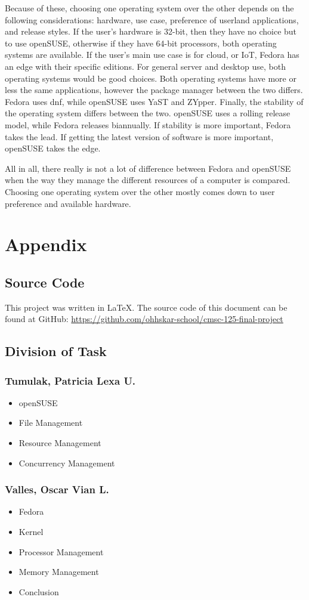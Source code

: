 \documentclass{article}
\begin{document}
Because of these, choosing one operating system over the other depends on the
following considerations: hardware, use case, preference of userland
applications, and release styles. If the user’s hardware is 32-bit, then they
have no choice but to use openSUSE, otherwise if they have 64-bit processors,
both operating systems are available. If the user’s main use case is for cloud,
or IoT, Fedora has an edge with their specific editions. For general server and
desktop use, both operating systems would be good choices. Both operating
systems have more or less the same applications, however the package manager
between the two differs. Fedora uses dnf, while openSUSE uses YaST and ZYpper.
Finally, the stability of the operating system differs between the two. openSUSE
uses a rolling release model, while Fedora releases biannually. If stability is
more important, Fedora takes the lead. If getting the latest version of software
is more important, openSUSE takes the edge.

All in all, there really is not a lot of difference between Fedora and openSUSE
when the way they manage the different resources of a computer is compared.
Choosing one operating system over the other mostly comes down to user
preference and available hardware.

\newpage
\nocite{*} \printbibliography[heading=bibintoc,title={References}]{}

\newpage
\section{Appendix}
\subsection{Source Code}
This project was written in \LaTeX{}. The source code of this document can be
found at GitHub:
\url{https://github.com/ohhskar-school/cmsc-125-final-project}
\subsection{Division of Task}
\subsubsection{Tumulak, Patricia Lexa U.}
\begin{itemize}
  \item{openSUSE}
  \item{File Management}
  \item{Resource Management}
  \item{Concurrency Management}
\end{itemize}
\subsubsection{Valles, Oscar Vian L.}
\begin{itemize}
  \item{Fedora}
  \item{Kernel}
  \item{Processor Management}
  \item{Memory Management}
  \item{Conclusion}
\end{itemize}
\end{document}
